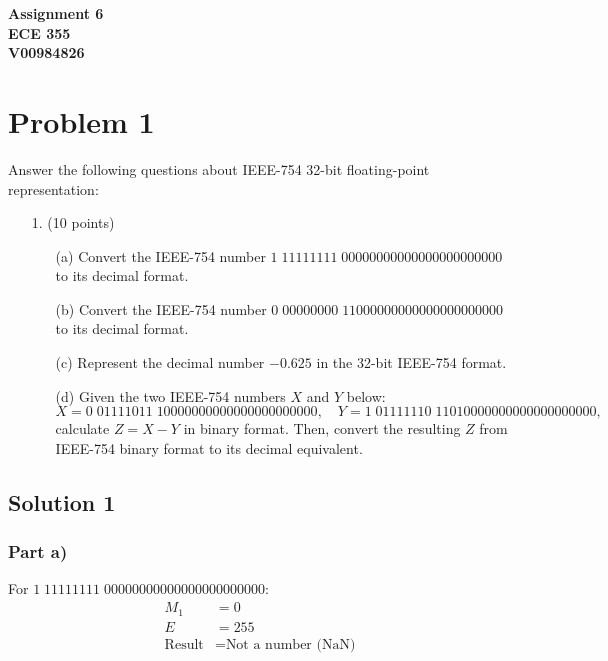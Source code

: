 \documentclass{article}
\begin{document}
\begin{center}
    \textbf{\LARGE Assignment 6} \\[1ex]
    \textbf{ECE 355} \\[1ex]
    \textbf{V00984826} \\[2ex]
\end{center}

\section*{Problem 1}

Answer the following questions about IEEE-754 32-bit floating-point representation:

\begin{enumerate}
    \item[1.] (10 points)
    \begin{enumerate}
        \item[(a)] Convert the IEEE-754 number \(1 \; 11111111 \; 00000000000000000000000\) to its decimal format.
        \item[(b)] Convert the IEEE-754 number \(0 \; 00000000 \; 11000000000000000000000\) to its decimal format.
        \item[(c)] Represent the decimal number \(-0.625\) in the 32-bit IEEE-754 format.
        \item[(d)] Given the two IEEE-754 numbers \(X\) and \(Y\) below:
        \[
        X = 0 \; 01111011 \; 10000000000000000000000, \quad
        Y = 1 \; 01111110 \; 11010000000000000000000,
        \]
        calculate \(Z = X - Y\) in binary format. Then, convert the resulting \(Z\) from IEEE-754 binary format to its decimal equivalent.
    \end{enumerate}
\end{enumerate}

\subsection*{Solution 1}

\subsubsection*{Part a)}
For \(1 \; 11111111 \; 00000000000000000000000\):
\begin{align*}
M_1 &= 0 \\
E &= 255 \\
\text{Result} &= \text{Not a number (NaN)}
\end{align*}
\end{document}
